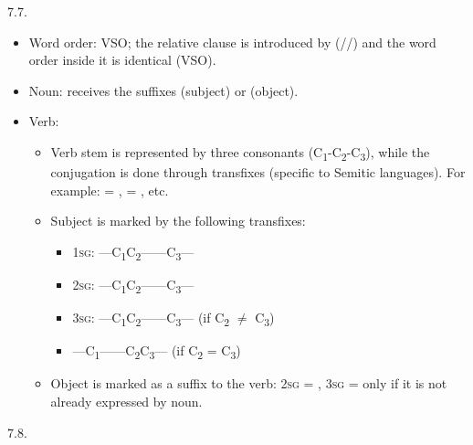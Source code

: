 \begin{refsection}
\begin{practiceproblemsolution}{7.7. \langnameArabic}
\begin{itemize}
    \item Word order: VSO; the relative clause is introduced by  (\slash {}\slash {}) and the word order inside it is identical (VSO).
    \item Noun: receives the suffixes  (subject) or  (object).
    \pagebreak
    \item Verb:
    \begin{itemize}
        \item Verb stem is represented by three consonants (C\textsubscript{1}-C\textsubscript{2}-C\textsubscript{3}), while the conjugation is done through transfixes (specific to Semitic languages). For example:  = ,  = , etc.
        \item Subject is marked by the following transfixes:
        \begin{itemize}
            \item 1\textsc{sg}: ---C\textsubscript{1}C\textsubscript{2}------C\textsubscript{3}---
            \item 2\textsc{sg}: ---C\textsubscript{1}C\textsubscript{2}------C\textsubscript{3}---
            \item 3\textsc{sg}: ---C\textsubscript{1}C\textsubscript{2}------C\textsubscript{3}--- \quad\quad (if C\textsubscript{2} $\neq$ C\textsubscript{3})
            \item[] ---C\textsubscript{1}------C\textsubscript{2}C\textsubscript{3}--- \quad\quad (if C\textsubscript{2} = C\textsubscript{3})
\end{itemize}
        \item Object is marked as a suffix to the verb: 2\textsc{sg} = , 3\textsc{sg} =  only if it is not already expressed by noun.
    \end{itemize}
\end{itemize}

\end{practiceproblemsolution}

\begin{practiceproblemsolution}{7.8. \langnameWelsh}

\begin{solutions}[label=Solution 7.8\alph*]
    \item
    \begin{enumerate}[start = 8]


\end{enumerate}
\end{solutions}
\end{practiceproblemsolution}
\end{refsection}
